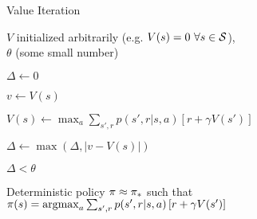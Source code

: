 
\begin{algorithm}
\caption{Value Iteration}
\label{alg:valueiter}

\begin{algorithmic}[0]

	\Require $V$ initialized arbitrarily
		(e.g. $V(s) = 0 \ \forall s \in \States$), \\
		$\theta$ (some small number)

	\Repeat

		\State $\Delta \gets 0$


			\State $v \gets V(s)$

			\State $V(s) \gets
				\max_a \sum_{s',r} {
					p(s',r|s,a)\left[ r + \gamma V(s') \right]
				}$

			\State $\Delta \gets \max(\Delta, |v-V(s)|)$

		\EndFor

	\Until $\Delta < \theta$

	\State \Return Deterministic policy $\pi \approx \pi_*$
		such that \\
		$\pi(s) = \operatorname*{argmax}_a \sum_{s',r} {
					p(s',r|s,a)\left[ r + \gamma V(s') \right]
				}$

\end{algorithmic}

\end{algorithm}
